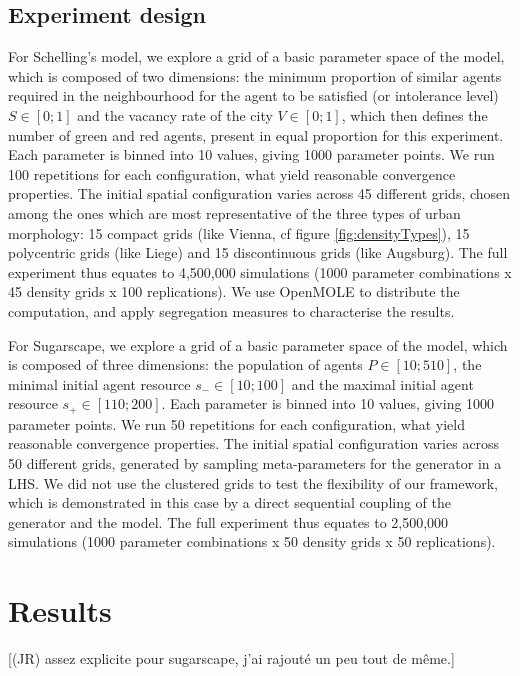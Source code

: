 \documentclass[Afour,sageh,times]{sagej}
\begin{document}
\subsection{Experiment design}
For Schelling's model, we explore a grid of a basic parameter space of the model, which is composed of two dimensions: the minimum proportion of similar agents required in the neighbourhood for the agent to be satisfied (or intolerance level) $S\in \left[0;1\right]$ and the vacancy rate of the city $V\in \left[0;1\right]$, which then defines the number of green and red agents, present in equal proportion for this experiment. Each parameter is binned into 10 values, giving 1000 parameter points. We run 100 repetitions for each configuration, what yield reasonable convergence properties. The initial spatial configuration varies across 45 different grids, chosen among the ones which are most representative of the three types of urban morphology: 15 compact grids (like Vienna, cf figure \ref{fig:densityTypes}), 15 polycentric grids (like Liege) and 15 discontinuous grids (like Augsburg). The full experiment thus equates to 4,500,000 simulations (1000 parameter combinations x 45 density grids x 100 replications). We use OpenMOLE to distribute the computation, and apply segregation measures to characterise the results. 

For Sugarscape, we explore a grid of a basic parameter space of the model, which is composed of three dimensions: the population of agents $P\in \left[10;510\right]$, the minimal initial agent resource $s_{-}\in \left[10;100\right]$ and the maximal initial agent resource $s_{+}\in \left[110;200\right]$. Each parameter is binned into 10 values, giving 1000 parameter points. We run 50 repetitions for each configuration, what yield reasonable convergence properties. The initial spatial configuration varies across 50 different grids, generated by sampling meta-parameters for the generator in a LHS. We did not use the clustered grids to test the flexibility of our framework, which is demonstrated in this case by a direct sequential coupling of the generator and the model. The full experiment thus equates to 2,500,000 simulations (1000 parameter combinations x 50 density grids x 50 replications). 


\section{Results}

[(JR) assez explicite pour sugarscape, j'ai rajouté un peu tout de même.]
\end{document}
